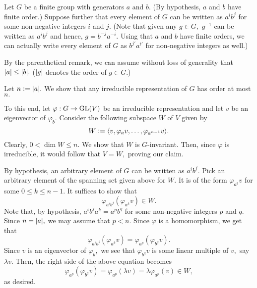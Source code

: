 \begin{ex}
	Let $G$ be a finite group with generators $a$ and $b.$ (By hypothesis, $a$ and $b$ have finite order.) Suppose further that every element of $G$ can be written as $a^ib^j$ for some non-negative integers $i$ and $j.$ (Note that given any $g \in G,$ $g^{-1}$ can be written as $a^ib^j$ and hence, $g = b^{-j}a^{-i}.$ Using that $a$ and $b$ have finite orders, we can actually write every element of $G$ as $b^{j'}a^{i'}$ for non-negative integers as well.)

	By the parenthetical remark, we can assume without loss of generality that ${\left\lvert a \right\lvert} \le {\left\lvert b \right\lvert}.$ (${\left\lvert g \right\lvert}$ denotes the order of $g \in G.$)

	Let $n \vcentcolon= {\left\lvert a \right\lvert}.$ We show that any irreducible representation of $G$ has order at most $n.$ 

	To this end, let $\varphi : G \to \operatorname{GL}(V)$ be an irreducible representation and let $v$ be an eigenvector of $\varphi_b.$ Consider the following subspace $W$ of $V$ given by
	\begin{equation*} 
		W \vcentcolon= \langle v, \varphi_av, \ldots, \varphi_{a^{n-1}}v\rangle.
	\end{equation*}
	Clearly, $0 < \dim W \le n.$ We show that $W$ is $G$-invariant. Then, since $\varphi$ is irreducible, it would follow that $V = W,$ proving our claim.

	By hypothesis, an arbitrary element of $G$ can be written as $a^ib^j.$ Pick an arbitrary element of the spanning set given above for $W.$ It is of the form $\varphi_{a^k}v$ for some $0 \le k \le n - 1.$ It suffices to show that 
	\begin{equation*} 
		\varphi_{a^ib^j}\left(\varphi_{a^k}v\right) \in W.
	\end{equation*}
	Note that, by hypothesis, $a^ib^ja^k = a^pb^q$ for some non-negative integers $p$ and $q.$ Since $n = {\left\lvert a \right\lvert},$ we may assume that $p < n.$ Since $\varphi$ is a homomorphism, we get that
	\begin{equation*} 
		\varphi_{a^ib^j}\left(\varphi_{a^k}v\right) = \varphi_{a^p}\left(\varphi_{b^q}v\right).
	\end{equation*}
	Since $v$ is an eigenvector of $\varphi_b,$ we see that $\varphi_{b^q}v$ is some linear multiple of $v,$ say $\lambda v.$ Then, the right side of the above equation becomes
	\begin{equation*} 
		\varphi_{a^p}\left(\varphi_{b^q}v\right) = \varphi_{a^p}\left(\lambda v\right) = \lambda \varphi_{a^p}(v) \in W,
	\end{equation*}
	as desired.
\end{ex}

